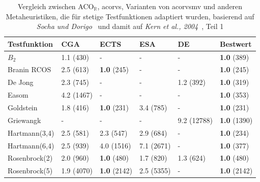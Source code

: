 \documentclass[fontsize=12, a4aper]{scrartcl}
\begin{document}
	\begin{table}[H]
		
		\caption{Vergleich zwischen ACO\(_{\mathbb{R}}\), \acl{acorvs}, Varianten von \acl{acorvsmv} und anderen Metaheuristiken, die für stetige Testfunktionen adaptiert wurden, basierend auf \textit{Socha und Dorigo}~\cite{socha2008ant} und damit auf \textit{Kern et al., 2004}~\cite{kern2004learning}, Teil 1}
		
		\label{subsec:Vergleich_Von_ACO_R_ACO_R_Very_Simple_Und_Iterationen:tab:Vergleich_Mit_Meta_-_Heuristiken_Adaptiert_Fuer_Stetige_Probleme_Teil_1}
		
		\scriptsize
		
		\begin{tabularx}{\linewidth}{ l X X X X X}
			
			\toprule
			
			Testfunktion & CGA & ECTS & ESA & DE & Bestwert\\
			
			\midrule
			
			\(B_2\) & 1.1 (430) & - & - & - & \textbf{1.0} (389)\\
			
			Branin RCOS & 2.5 (613) & \textbf{1.0} (245) & - & - & \textbf{1.0} (245)\\
			 
			De Jong & 2.3 (745) & - & - & 1.2 (392) & \textbf{1.0} (319)\\
			
			Easom & 4.2 (1467) & - & - & - & \textbf{1.0} (353)\\
			
			Goldstein & 1.8 (416) & \textbf{1.0} (231) & 3.4 (785) & - & \textbf{1.0} (231)\\
			
			Griewangk & - & - & - & 9.2 (12788) & \textbf{1.0} (1390)\\
			
			Hartmann(3,4) & 2.5 (581) & 2.3 (547) & 2.9 (684) & - & \textbf{1.0} (234)\\
			
			Hartmann(6,4) & 2.5 (939) & 4.0 (1516) & 7.1 (2671) & - & \textbf{1.0} (377)\\
			
			Rosenbrock(2) & 2.0 (960) & \textbf{1.0} (480) & 1.7 (820) & 1.3 (624) & \textbf{1.0} (480)\\
			
			Rosenbrock(5) & 1.9 (4070) & \textbf{1.0} (2142) & 2.5 (5355) & - & \textbf{1.0} (2142)\\
			

\end{tabularx}
\end{table}
\end{document}
